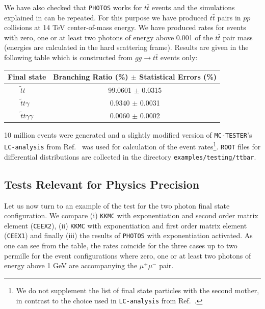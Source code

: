 \documentclass[]{Photos_interface_design}
\begin{document}
We have also checked that {\tt PHOTOS} works for $t \bar t$ events and the simulations explained in \cite{RichterWas:1993ta} can be repeated.
For this purpose we have produced $t \bar t$ pairs in $pp$ collisions at 
14 TeV center-of-mass energy. We have produced rates for events with zero, one or
at least two photons of energy above 0.001 of the $t \bar t$ pair mass
(energies are calculated in  the hard scattering frame).
Results are given in the following table which is constructed from  
$gg \to t \bar t$ events only:


\vspace{0.3cm} 
\begin{center}
{ \begin{tabular}{c c} 
\toprule 
Final state &  Branching Ratio (\%) $\pm$ Statistical Errors (\%) \\  
\midrule
{$ \widetilde{t} t \; \;\; \;$}  &  {99.0601 $\pm$ 0.0315}  \\ 
 {$  \widetilde{t} t \gamma \;\;$} &   { 0.9340 $\pm$  0.0031}   \\ 
{$  \widetilde{t} t \gamma \gamma$}  &  { 0.0060 $\pm$  0.0002}  \\ 
\bottomrule
\end{tabular} 
}  
\end{center} 

10 million events were generated and a slightly modified 
version of {\tt MC-TESTER}'s {\tt LC-analysis} from Ref.~\cite{Golonka:2002rz}
was used for calculation of the event rates\footnote{  We do not supplement the list of 
final state particles with the second mother, in contrast to the choice used in {\tt LC-analysis} from  Ref.~\cite{Golonka:2002rz}. }.
{\tt ROOT} files for differential distributions are 
collected in the directory {\tt examples/testing/ttbar}. 

\subsection{Tests Relevant for Physics Precision}


Let us now turn to an example of the test for the two photon final state configuration.
We compare (i) {\tt KKMC} \cite{kkcpc:1999} with exponentiation and second order matrix element ({\tt CEEX2}), (ii) {\tt KKMC} with exponentiation and first order matrix element ({\tt CEEX1})
and finally (iii) the results of {\tt PHOTOS} with exponentiation activated. As one can see from the table, the rates 
coincide for the three cases up to two permille for the event configurations 
where zero, one or at least two photons of energy above 1 GeV are accompanying the $\mu^+\mu^-$ pair.
\end{document}
